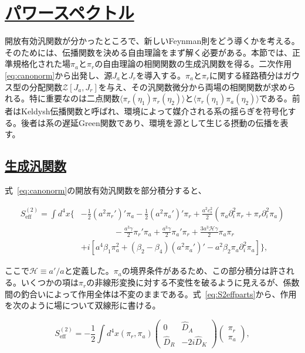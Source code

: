 \documentclass[a4paper,11pt]{ltjsarticle}
\newcommand{\sectionlink}[1]{\section[#1]{\hyperlink{toc}{#1}}}
\newcommand{\subsectionlink}[1]{\subsection[#1]{\hyperlink{toc}{#1}}}
\numberwithin{equation}{section}
\def\pia{\pi_{a}}
\def\pir{\pi_{r}}
\newcommand{\Eq}[1]{Eq.~(\ref{#1})}
\renewcommand{\Eq}[1]{式~\eqref{#1}}
\begin{document}
\sectionlink{パワースペクトル}\label{sec:Pk}

開放有効汎関数が分かったところで、新しいFeynman則をどう導くかを考える。そのためには、伝播関数を決める自由理論をまず解く必要がある。本節では、正準規格化された場$\pia$と$\pir$の自由理論の相関関数の生成汎関数を得る。二次作用\eqref{eq:canonorm}から出発し、源$J_a$と$J_r$を導入する。$\pia$と$\pir$に関する経路積分はガウス型の分配関数$\mathcal{Z}[J_a,J_r]$を与え、その汎関数微分から両場の相関関数が求められる。特に重要なのは二点関数$\langle\pir(\eta_1)\pir(\eta_2)\rangle$と$\langle\pir(\eta_1)\pia(\eta_2)\rangle$である。前者はKeldysh伝播関数と呼ばれ、環境によって媒介される系の揺らぎを符号化する\cite{kamenev_2011}。後者は系の遅延Green関数であり、環境を源として生じる摂動の伝播を表す。

\subsectionlink{生成汎関数}

\Eq{eq:canonorm}の開放有効汎関数を部分積分すると、

\begin{align}
S_{\text{eff}}^{(2)} =\int d^{4}x\bigg\{&-\frac{1}{2}\left(a^{2}\pir'\right)' \pia-\frac{1}{2} \left(a^{2}\pia'\right)' \pir+\frac{a^2 c_s^2}{2} \left(\pia\partial_{i}^{2}\pir+\pir\partial_{i}^{2}\pia\right)\nonumber\\
&\qquad \qquad -\frac{a^3\gamma}{2}\pir'\pia+\frac{a^3\gamma}{2}\pia'\pir+\frac{3a^3\mathcal{H}\gamma}{2} \pia\pir\nonumber\\
&+i \left[a^4\beta_1  \pia^2 + \left(\beta_2 - \beta_4\right)\left(a^{2}\pia'\right)' - a^2\beta_2 \pia\partial_i^{2} \pia \right]\bigg\},\label{eq:S2effparts}
\end{align}

ここで$\mathcal{H}\equiv a'/a$と定義した。$\pia$の境界条件があるため、この部分積分は許される。いくつかの項は$\pir$の非線形変換に対する不変性を破るように見えるが、係数間の釣合いによって作用全体は不変のままである。\Eq{eq:S2effparts}から、作用を次のように場について双線形に書ける。

\begin{equation}
S_{\text{eff}}^{(2)} = -\frac{1}{2}\int d^{4}x \left(\pir,\pia\right)\begin{pmatrix}
0 & \widehat{D}_{A} \\ \widehat{D}_{R} & -2i\widehat{D}_{K}
\end{pmatrix}\begin{pmatrix}
\pir \\ \pia
\end{pmatrix},
\end{equation}
\end{document}
